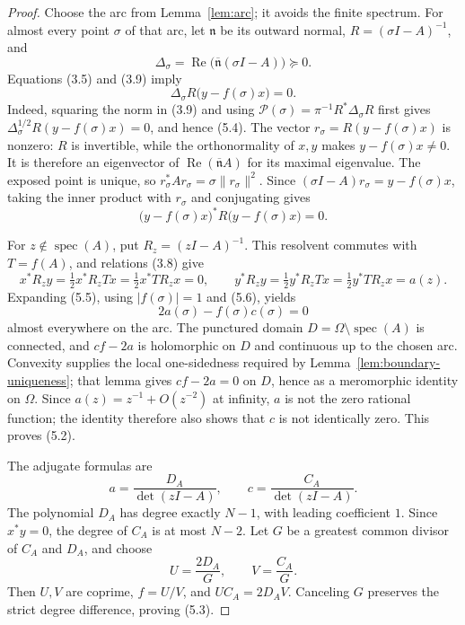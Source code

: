 \documentclass[preprints,article,submit,oneauthor]{Definitions/mdpi}
\numberwithin{equation}{section}
\newcommand{\spec}{\operatorname{spec}}
\newcommand{\Rea}{\operatorname{Re}}
\begin{document}
\begin{proof}
Choose the arc from Lemma~\ref{lem:arc}; it avoids the finite spectrum.  For
almost every point \(\sigma\) of that arc, let \(\mathfrak n\) be its outward
normal, \(R=(\sigma I-A)^{-1}\), and
\[
 \Delta_\sigma=\Rea\bigl(\overline{\mathfrak n}(\sigma I-A)\bigr)\succeq0.
\]
Equations (3.5) and (3.9) imply
\[
 \Delta_\sigma R\bigl(y-f(\sigma)x\bigr)=0.           \tag{5.4}
\]
Indeed, squaring the norm in (3.9) and using
\(\mathcal P(\sigma)=\pi^{-1}R^*\Delta_\sigma R\) first gives
\(\Delta_\sigma^{1/2}R(y-f(\sigma)x)=0\), and hence (5.4).
The vector
\(r_\sigma=R(y-f(\sigma)x)\) is nonzero: \(R\) is invertible, while the
orthonormality of \(x,y\) makes \(y-f(\sigma)x\neq0\).  It is therefore an
eigenvector of \(\Rea(\overline{\mathfrak n}A)\) for its maximal eigenvalue.
The exposed point is unique, so
\(r_\sigma^*Ar_\sigma=\sigma\|r_\sigma\|^2\).  Since
\((\sigma I-A)r_\sigma=y-f(\sigma)x\), taking the inner product with
\(r_\sigma\) and conjugating gives
\[
 \bigl(y-f(\sigma)x\bigr)^*
 R\bigl(y-f(\sigma)x\bigr)=0.                         \tag{5.5}
\]

For \(z\notin\spec(A)\), put \(R_z=(zI-A)^{-1}\).  This resolvent commutes
with \(T=f(A)\), and relations (3.8) give
\[
 x^*R_z y=\tfrac12x^*R_zTx=\tfrac12x^*TR_zx=0,
 \qquad
 y^*R_z y=\tfrac12y^*R_zTx=\tfrac12y^*TR_zx=a(z).   \tag{5.6}
\]
Expanding (5.5), using \(|f(\sigma)|=1\) and (5.6), yields
\[
 2a(\sigma)-f(\sigma)c(\sigma)=0                     \tag{5.7}
\]
almost everywhere on the arc.  The punctured domain
\(D=\Omega\setminus\spec(A)\) is connected, and \(cf-2a\) is holomorphic on
\(D\) and continuous up to the chosen arc.  Convexity supplies the local
one-sidedness required by Lemma~\ref{lem:boundary-uniqueness}; that lemma gives
\(cf-2a=0\) on \(D\), hence as a meromorphic identity on \(\Omega\).  Since
\(a(z)=z^{-1}+O(z^{-2})\) at infinity, \(a\) is not the
zero rational function; the identity therefore also shows that \(c\) is not
identically zero.  This proves (5.2).

The adjugate formulas are
\[
 a=\frac{D_A}{\det(zI-A)},\qquad
 c=\frac{C_A}{\det(zI-A)}.
\]
The polynomial \(D_A\) has degree exactly \(N-1\), with leading coefficient
\(1\).  Since \(x^*y=0\), the degree of \(C_A\) is at most \(N-2\).  Let
\(G\) be a greatest common divisor of \(C_A\) and \(D_A\), and choose
\[
 U=\frac{2D_A}{G},\qquad V=\frac{C_A}{G}.
\]
Then \(U,V\) are coprime, \(f=U/V\), and
\(UC_A=2D_AV\).  Canceling \(G\) preserves the strict degree difference,
proving (5.3).
\end{proof}
\end{document}
